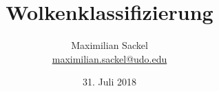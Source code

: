 

\subject{Maschinelles Lernen für Physiker*innen}
\title{Wolkenklassifizierung}

\author{%
  Maximilian Sackel\\%
  \href{mailto:maximilian.sackel@udo.edu}{maximilian.sackel@udo.edu}%
}
\date{%
  31. Juli 2018
}



\maketitle
\thispagestyle{empty}
\tableofcontents
\newpage
\nocite{keras}








\printbibliography{}


